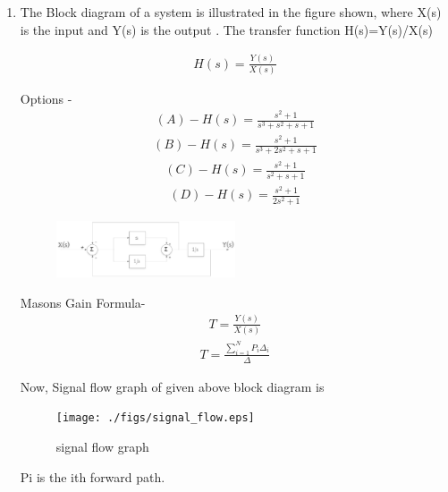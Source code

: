 \begin{enumerate}[label=\thesection.\arabic*.,ref=\thesection.\theenumi]
\item The Block diagram of a system is illustrated in the figure shown, where X(s) is the input and Y(s) is the output . The transfer function H(s)=Y(s)/X(s)

\begin{align}
 H(s)=\frac{Y(s)}{X(s)} 
\end{align}

Options -
 \begin{align}
 (A) - H(s)=\frac{s^2+1}{s^3+s^2+s+1}
 \end{align}
 \begin{align}
 (B) - H(s)=\frac{s^2+1}{s^3+2s^2+s+1}
 \end{align}
 \begin{align}
 (C) - H(s)=\frac{s^2+1}{s^2+s+1}
 \end{align}
 \begin{align}
 (D) - H(s)=\frac{s^2+1}{2s^2+1}
 \end{align}

\begin{figure}
\centering
\includegraphics[width=0.5\textwidth]{./figs/pic1.eps}
\caption{}
\label{fig:sec_order}
\end{figure}

\solution 
Masons Gain Formula- 
\begin{align}
T = \frac{Y(s)}{X(s)} 
\end{align}
\begin{align}
T = \frac{\sum_{i=1}^{N} P_i\Delta_i}{\Delta}
\end{align}

Now, Signal flow graph of given above block diagram is

\begin{figure}
\centering
\texttt{[image: ./figs/signal\_flow.eps]}
\caption{signal flow graph}
\label{fig:sec_order}
\end{figure}


Pi is the ith forward path.


\end{enumerate}
